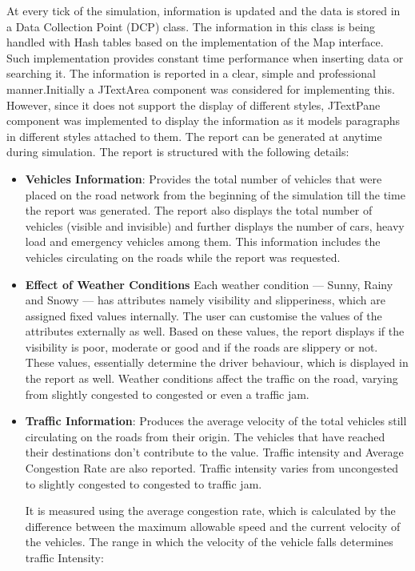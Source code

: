 \documentclass[11pt,a4paper]{article}
\begin{document}
  At every tick of the simulation, information is updated and the data
  is stored in a Data Collection Point (DCP) class. The information in
  this class is being handled with Hash tables based on the
  implementation of the Map interface. Such implementation provides
  constant time performance when inserting data or searching it.
  The information is reported in a clear, simple and professional
  manner.Initially a JTextArea component was considered for implementing this.
  However, since it does not support the display of different styles,
  JTextPane component was implemented to display the information as it
  models paragraphs in different styles attached to them.
  The report can be generated at anytime during simulation. The report is structured with the following details:
  \begin{itemize}
  	\item \textbf{Vehicles Information}: Provides the total number of vehicles that were placed on the road network from the beginning of the simulation till the time the report was generated. The report also displays the total number of vehicles (visible and invisible) and further displays the number of cars, heavy load and emergency vehicles among them. This information includes the vehicles circulating on the roads while the report was requested.
  	\item \textbf{Effect of Weather Conditions}	Each weather condition --- Sunny, Rainy and Snowy --- has attributes namely visibility and slipperiness, which are assigned fixed values internally. The user can customise the values of the attributes externally as well. Based on these values, the report displays if the visibility is poor, moderate or good and if the roads are slippery or not. These values, essentially determine the driver behaviour, which is displayed in the report as well. Weather conditions affect the traffic on the road, varying from slightly congested to congested or even a traffic jam.
  	\item \textbf{Traffic Information}: Produces the average velocity of the total vehicles still circulating on the roads from their origin. The vehicles that have reached their destinations don’t contribute to the value. Traffic intensity and Average Congestion Rate are also reported. Traffic intensity varies from uncongested to slightly congested to congested to traffic jam. 
		
  		It is measured using the average congestion rate, which is
  		calculated by the difference between the maximum allowable
  		speed and the current velocity of the vehicles. The range in
  		which the velocity of the vehicle falls determines traffic
  		Intensity:
  		

\end{itemize}
\end{document}
